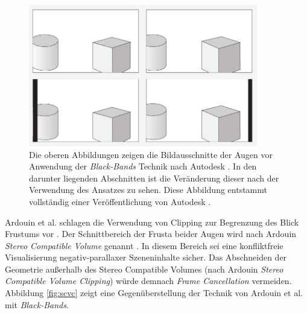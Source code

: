 \begin{figure}
	\begin{center}
		\includegraphics[width=10cm]{img/black_bands.pdf}
	\end{center}
	\caption{Die oberen Abbildungen zeigen die Bildausschnitte der Augen vor Anwendung der \emph{Black-Bands} Technik nach Autodesk \cite{autodesk:2008}. In den darunter liegenden Abschnitten ist die Veränderung dieser nach der Verwendung des Ansatzes zu sehen. Diese Abbildung entstammt vollständig einer Veröffentlichung von Autodesk \cite{autodesk:2008}.}
	\label{fig:black_bands}
\end{figure}

Ardouin et al. schlagen die Verwendung von Clipping zur Begrenzung des Blick Frustums vor \cite{ardouin:2011}. Der Schnittbereich der Frusta beider Augen wird nach Ardouin \emph{Stereo Compatible Volume} genannt \cite{ardouin:2011}. In diesem Bereich sei eine konfliktfreie Visualisierung negativ-parallaxer Szeneninhalte sicher. Das Abschneiden der Geometrie außerhalb des Stereo Compatible Volumes (nach Ardouin \emph{Stereo Compatible Volume Clipping}) würde demnach \emph{Frame Cancellation} vermeiden. Abbildung \ref{fig:scvc} zeigt eine Gegenüberstellung der Technik von Ardouin et al. mit \emph{Black-Bands}.

